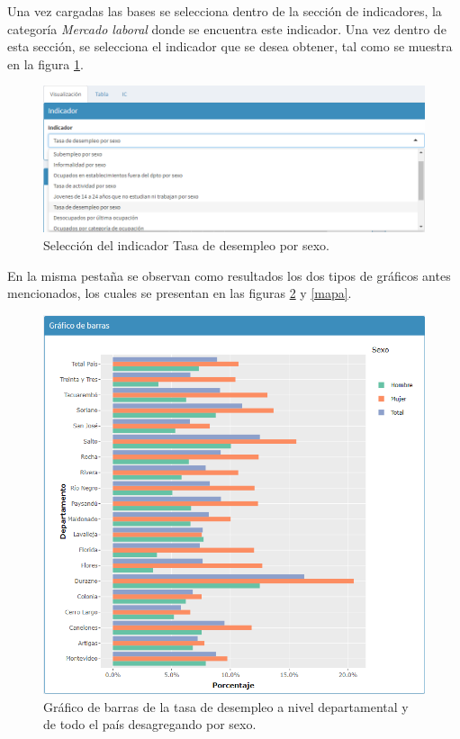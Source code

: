 \documentclass[12pt,twoside,spanish,a4paper]{book}\usepackage[]{graphicx}\usepackage[]{color}
\begin{document}
Una vez cargadas las bases se selecciona dentro de la sección de indicadores, la categoría \textit{Mercado laboral} donde se encuentra este indicador. Una vez dentro de esta sección, se selecciona el indicador que se desea obtener, tal como se muestra en la figura \ref{ind}.

\begin{figure}[ht]
\begin{center}
\includegraphics[width=1\textwidth]{img/indicador.png}
\caption{Selección del indicador Tasa de desempleo por sexo. \label{ind}}
\end{center}
\end{figure}

En la misma pestaña se observan como resultados los dos tipos de gráficos antes mencionados, los cuales se presentan en las figuras \ref{barras} y \ref{mapa}.

\begin{figure}[h]
\begin{center}
\includegraphics[width=1\textwidth]{img/barras.PNG}
\caption{Gráfico de barras de la tasa de desempleo a nivel departamental y de todo el país desagregando por sexo. \label{barras}}
\end{center}
\end{figure}
\end{document}
